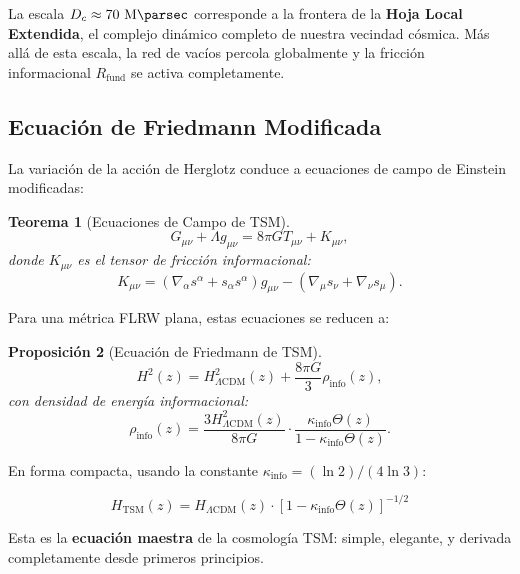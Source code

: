 \documentclass[11pt, a4paper]{article}
\theoremstyle{plain}
\newtheorem{teorema}{Teorema}[section]
\newtheorem{proposicion}[teorema]{Proposición}
\theoremstyle{definition}
\newcommand{\Rfactor}{R_{\text{fund}}}
\newcommand{\Kinfo}{\kappa_{\text{info}}}
\begin{document}
La escala $D_c \approx 70\ \si{\mega\parsec}$ corresponde a la frontera de la \textbf{Hoja Local Extendida}, el complejo dinámico completo de nuestra vecindad cósmica. Más allá de esta escala, la red de vacíos percola globalmente y la fricción informacional $\Rfactor$ se activa completamente.

\subsection{Ecuación de Friedmann Modificada}

La variación de la acción de Herglotz conduce a ecuaciones de campo de Einstein modificadas:

\begin{teorema}[Ecuaciones de Campo de TSM]
\begin{equation}
G_{\mu\nu} + \Lambda g_{\mu\nu} = 8\pi G T_{\mu\nu} + K_{\mu\nu},
\label{eq:field_equations}
\end{equation}
donde $K_{\mu\nu}$ es el tensor de fricción informacional:
\begin{equation}
K_{\mu\nu} = (\nabla_\alpha s^\alpha + s_\alpha s^\alpha) g_{\mu\nu} - (\nabla_\mu s_\nu + \nabla_\nu s_\mu).
\end{equation}
\end{teorema}

Para una métrica FLRW plana, estas ecuaciones se reducen a:

\begin{proposicion}[Ecuación de Friedmann de TSM]
\begin{equation}
H^2(z) = H^2_{\Lambda\text{CDM}}(z) + \frac{8\pi G}{3} \rho_{\text{info}}(z),
\label{eq:friedmann_tsm_full}
\end{equation}
con densidad de energía informacional:
\begin{equation}
\rho_{\text{info}}(z) = \frac{3H^2_{\Lambda\text{CDM}}(z)}{8\pi G} \cdot \frac{\Kinfo \Theta(z)}{1 - \Kinfo \Theta(z)}.
\end{equation}
\end{proposicion}

En forma compacta, usando la constante $\Kinfo = (\ln 2)/(4\ln 3)$:

\begin{equation}
\boxed{H_{\text{TSM}}(z) = H_{\Lambda\text{CDM}}(z) \cdot \left[1 - \Kinfo \Theta(z)\right]^{-1/2}}
\label{eq:friedmann_compact}
\end{equation}

Esta es la \textbf{ecuación maestra} de la cosmología TSM: simple, elegante, y derivada completamente desde primeros principios.
\end{document}
